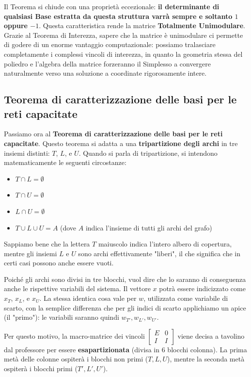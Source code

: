 \documentclass[12pt, a4paper]{article}
\begin{document}
	Il Teorema si chiude con una proprietà eccezionale: \textbf{il determinante di qualsiasi Base estratta da questa struttura varrà sempre e soltanto $1$ oppure $-1$}. 
	Questa caratteristica rende la matrice \textbf{Totalmente Unimodulare}. 
	Grazie al Teorema di Interezza, sapere che la matrice è unimodulare ci permette di godere di un enorme vantaggio computazionale: possiamo tralasciare completamente i complessi vincoli di interezza, in quanto la geometria stessa del poliedro e l'algebra della matrice forzeranno il Simplesso a convergere naturalmente verso una soluzione a coordinate rigorosamente intere.
	
	\subsection*{Teorema di caratterizzazione delle basi per le reti capacitate}
	Passiamo ora al \textbf{Teorema di caratterizzazione delle basi per le reti capacitate}. Questo teorema si adatta a una \textbf{tripartizione degli archi} in tre insiemi distinti: $T$, $L$, e $U$.
	Quando si parla di tripartizione, si intendono matematicamente le seguenti circostanze:
	\begin{itemize}[label=\textcolor{titlecolor}{\Large\textbullet}, itemsep=2pt, leftmargin=1.5cm]
		\item $T \cap L = \emptyset$
		\item $T \cap U = \emptyset$
		\item $L \cap U = \emptyset$
		\item $T \cup L \cup U = A$ \quad (dove $A$ indica l'insieme di tutti gli archi del grafo)
	\end{itemize}
	Sappiamo bene che la lettera $T$ maiuscolo indica l'intero albero di copertura, mentre gli insiemi $L$ e $U$ sono archi effettivamente "liberi", il che significa che in certi casi possono anche essere vuoti.
	
	Poiché gli archi sono divisi in tre blocchi, vuol dire che lo saranno di conseguenza anche le rispettive variabili del sistema. Il vettore $x$ potrà essere indicizzato come $x_T$, $x_L$, e $x_U$. La stessa identica cosa vale per $w$, utilizzata come variabile di scarto, con la semplice differenza che per gli indici di scarto applichiamo un apice (il "primo"): le variabili saranno quindi $w_{T'}, w_{L'}, w_{U'}$.
	
	Per questo motivo, la macro-matrice dei vincoli $\begin{bmatrix} E & 0 \\ I & I \end{bmatrix}$ viene decisa a tavolino dal professore per essere \textbf{esapartizionata} (divisa in 6 blocchi colonna). La prima metà delle colonne ospiterà i blocchi non primi ($T, L, U$), mentre la seconda metà ospiterà i blocchi primi ($T', L', U'$).
	
\end{document}
